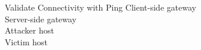 \begin{frame}{Validate Connectivity with Ping}
  \quad Client-side gateway\\[0.28cm]
  \quad Server-side gateway\\[0.28cm]
  \quad Attacker host\\[0.28cm]
  \quad Victim host
\end{frame}
